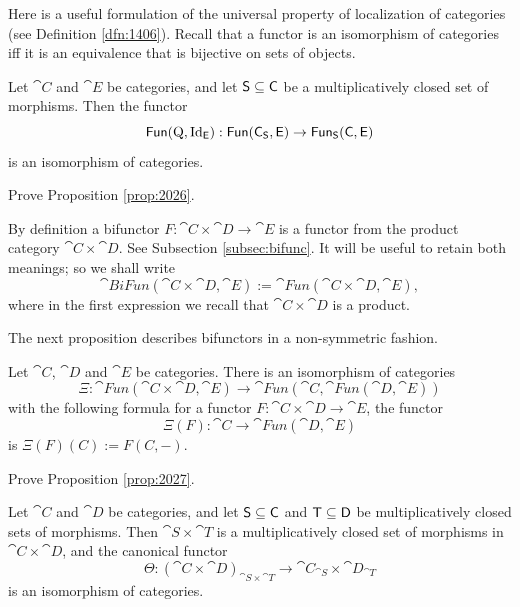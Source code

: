 Here is a useful formulation of the universal property of localization
of categories (see Definition \ref{dfn:1406}). 
Recall that a functor is an isomorphism of categories iff it is an equivalence 
that is bijective on sets of objects. 

\begin{prop} \label{prop:2026} 
Let $\cat{C}$ and $\cat{E}$ be categories, and let $\operatorname{\mathsf{S}} \subseteq \operatorname{\mathsf{C}}$ be a 
multiplicatively closed set of morphisms. Then the functor 
\[ \operatorname{\mathsf{Fun}}(\operatorname{Q}, \operatorname{Id}_{\operatorname{\mathsf{E}}}) : 
\operatorname{\mathsf{Fun}}(\operatorname{\mathsf{C}}_{\operatorname{\mathsf{S}}}, \operatorname{\mathsf{E}}) \to 
\operatorname{\mathsf{Fun}}_{\operatorname{\mathsf{S}}}(\operatorname{\mathsf{C}}, \operatorname{\mathsf{E}}) \]
is an isomorphism of categories.
\end{prop}

\begin{exer} \label{exer:2036}
Prove Proposition \ref{prop:2026}.
\end{exer}

By definition a bifunctor 
$F : \cat{C} \times \cat{D} \to \cat{E}$
is a functor from the product category $\cat{C} \times \cat{D}$.
See Subsection \ref{subsec:bifunc}.
It will be useful to retain both meanings; so we shall write 
\begin{equation} \label{eqn:2035}
\cat{BiFun}(\cat{C} \times \cat{D}, \cat{E}) := 
\cat{Fun}(\cat{C} \times \cat{D}, \cat{E}) ,
\end{equation}
where in the first expression we recall that $\cat{C} \times \cat{D}$ is a 
product. 

The next proposition describes bifunctors in a non-symmetric fashion. 

\begin{prop} \label{prop:2027} 
Let $\cat{C}$, $\cat{D}$ and $\cat{E}$ be categories. There is an isomorphism 
of categories 
\[ \Xi : \cat{Fun}(\cat{C} \times \cat{D}, \cat{E}) \to 
\cat{Fun}(\cat{C}, \cat{Fun}(\cat{D}, \cat{E})) \]
with the following formula\tup{:}
for a functor $F : \cat{C} \times \cat{D} \to \cat{E}$,
the functor
\[ \Xi(F) : \cat{C} \to \cat{Fun}(\cat{D}, \cat{E}) \]
is $\Xi(F)(C) := F(C, -)$.
\end{prop}

\begin{exer} \label{exer:2037}
Prove Proposition \ref{prop:2027}.
\end{exer}

\begin{prop}  \label{prop:2028} 
Let $\cat{C}$ and $\cat{D}$ be categories, and let 
$\operatorname{\mathsf{S}} \subseteq \operatorname{\mathsf{C}}$ and $\operatorname{\mathsf{T}} \subseteq \operatorname{\mathsf{D}}$
be multiplicatively closed sets of morphisms. Then
$\cat{S} \times \cat{T}$ is a multiplicatively closed set of morphisms
in $\cat{C} \times \cat{D}$, and the canonical functor 
\[ \Theta:  (\cat{C} \times \cat{D})_{\cat{S} \times \cat{T}} \to 
\cat{C}_{\cat{S}} \times \cat{D}_{\cat{T}} \]
is an isomorphism of categories. 
\end{prop}

